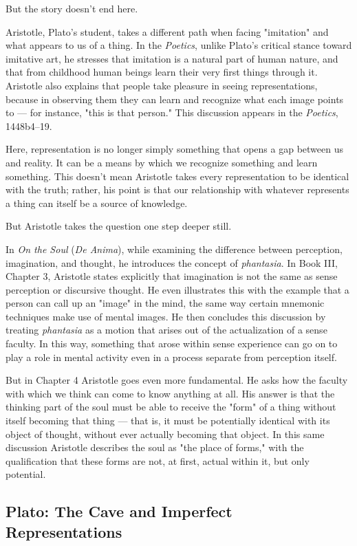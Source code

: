 But the story doesn't end here.

Aristotle, Plato's student, takes a different path when facing "imitation" and what appears to us of a thing. In the \textit{Poetics}, unlike Plato's critical stance toward imitative art, he stresses that imitation is a natural part of human nature, and that from childhood human beings learn their very first things through it. Aristotle also explains that people take pleasure in seeing representations, because in observing them they can learn and recognize what each image points to --- for instance, "this is that person." This discussion appears in the \textit{Poetics}, 1448b4--19.

Here, representation is no longer simply something that opens a gap between us and reality. It can be a means by which we recognize something and learn something. This doesn't mean Aristotle takes every representation to be identical with the truth; rather, his point is that our relationship with whatever represents a thing can itself be a source of knowledge.

But Aristotle takes the question one step deeper still.

In \textit{On the Soul} (\textit{De Anima}), while examining the difference between perception, imagination, and thought, he introduces the concept of \textit{phantasia}. In Book III, Chapter 3, Aristotle states explicitly that imagination is not the same as sense perception or discursive thought. He even illustrates this with the example that a person can call up an "image" in the mind, the same way certain mnemonic techniques make use of mental images. He then concludes this discussion by treating \textit{phantasia} as a motion that arises out of the actualization of a sense faculty. In this way, something that arose within sense experience can go on to play a role in mental activity even in a process separate from perception itself.

But in Chapter 4 Aristotle goes even more fundamental. He asks how the faculty with which we think can come to know anything at all. His answer is that the thinking part of the soul must be able to receive the "form" of a thing without itself becoming that thing --- that is, it must be potentially identical with its object of thought, without ever actually becoming that object. In this same discussion Aristotle describes the soul as "the place of forms," with the qualification that these forms are not, at first, actual within it, but only potential.

\subsection{Plato: The Cave and Imperfect Representations}
\label{sub:plato-cave}

